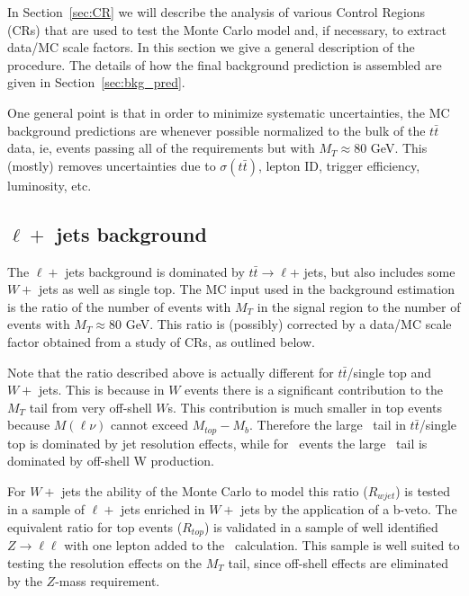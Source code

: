 In Section~\ref{sec:CR} we will describe the analysis of various Control Regions
(CRs)  that are used to test the Monte Carlo model and, if necessary,
to extract data/MC scale factors.  In this section we give a
general description of the procedure.  The details of how the
final background prediction is assembled are given in Section~\ref{sec:bkg_pred}.




One general point is that in order to minimize systematic uncertainties, the MC background
predictions are whenever possible normalized to the bulk of the $t\bar{t}$ data, ie, events passing all of the 
requirements but with $M_T \approx 80$ GeV.
This (mostly) removes uncertainties
due to $\sigma(t\bar{t})$, lepton ID, trigger efficiency, luminosity, etc.   

\subsection{$\ell +$ jets background}
\label{sec:ljbg-general}

The $\ell +$ jets background is dominated by 
$t\bar{t} \to \ell $+ jets, but also includes some $W +$ jets as well as single top.
The MC input used in the background estimation
is the ratio of the number of events with $M_T$ in the signal region
to the number of events with $M_T \approx 80$ GeV.
This ratio is (possibly) corrected by a data/MC scale factor obtained
from a study of CRs, as outlined below.

Note that the ratio described above is actually different for 
$t\bar{t}$/single top and $W +$ jets.  This is because in $W$ events
there is a significant contribution to the $M_T$ tail from very off-shell
$W$s.
This contribution is much smaller in top events because $M(\ell \nu)$
cannot exceed $M_{top}-M_b$. Therefore the large \mt\ tail in 
$t\bar{t}$/single top is dominated by jet resolution effects,
while for \wjets\ events the large \mt\ tail is dominated by off-shell W production.



For $W +$ jets the ability of the Monte Carlo to model this ratio
($R_{wjet}$) is tested in a sample of $\ell +$ jets enriched in 
$W +$ jets by the application of a b-veto.
The equivalent ratio for top events ($R_{top}$) is validated in a sample of well
identified $Z \to \ell \ell$ with one lepton added to the \met\
calculation.
This sample is well suited to testing the resolution effects on 
the $M_T$ tail, since off-shell effects are eliminated by the $Z$-mass
requirement.

